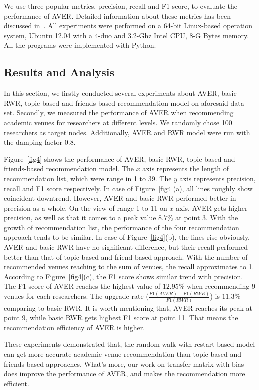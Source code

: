 \documentclass[9pt]{acm_proc_article-sp}
\begin{document}
We use three popular metrics, precision, recall and F1 score, to evaluate the performance of AVER. Detailed information about these metrics has been discussed in~\cite{xia2014mvcwalker}. All experiments were performed on a 64-bit Linux-based operation system, Ubuntu 12.04 with a 4-duo and 3.2-Ghz Intel CPU, 8-G Bytes memory. All the programs were implemented with Python.

\subsection{Results and Analysis}
In this section, we firstly conducted several experiments about AVER, basic RWR, topic-based and friends-based recommendation model on aforesaid data set. Secondly, we measured the performance of AVER when recommending academic venues for researchers at different levels. We randomly chose 100 researchers as target nodes. Additionally, AVER and RWR model were run with the damping factor 0.8.

Figure~\ref{fig4} shows the performance of AVER, basic RWR, topic-based and friends-based recommendation model. The $x$ axis represents the length of recommendation list, which were range in 1 to 39. The $y$ axis represents precision, recall and F1 score respectively. In case of Figure~\ref{fig4}(a), all lines roughly show coincident downtrend. However, AVER and basic RWR performed better in precision as a whole. On the view of range 1 to 11 on $x$ axis, AVER gets higher precision, as well as that it comes to a peak value $8.7\%$ at point 3. With the growth of recommendation list, the performance of the four recommendation approach tends to be similar. In case of Figure~\ref{fig4}(b), the lines rise obviously. AVER and basic RWR have no significant difference, but their recall performed better than that of topic-based and friend-based approach. With the number of recommended venues reaching to the sum of venues, the recall approximates to 1. According to Figure~\ref{fig4}(c), the F1 score shows similar trend with precision. The F1 score of AVER reaches the highest value of $12.95\%$ when recommending 9 venues for each researchers. The upgrade rate ($\frac{F1(AVER)-F1(RWR)}{F1(RWR)}$) is $11.3\%$ comparing to basic RWR. It is worth mentioning that, AVER reaches its peak at point 9, while basic RWR gets highest F1 score at point 11. That means the recommendation efficiency of AVER is higher.

These experiments demonstrated that, the random walk with restart based model can get more accurate academic venue recommendation than topic-based and friends-based approaches. What's more, our work on transfer matrix with bias does improve the performance of AVER, and makes the recommendation more efficient.
\end{document}
